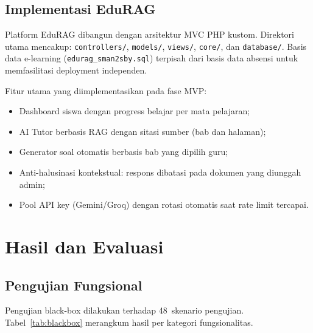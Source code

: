 \documentclass[12pt,a4paper]{article}
\newcommand{\edurag}{EduRAG}
\begin{document}
\subsection{Implementasi \edurag{}}

Platform \edurag{} dibangun dengan arsitektur MVC PHP kustom.
Direktori utama mencakup: \texttt{controllers/}, \texttt{models/},
\texttt{views/}, \texttt{core/}, dan \texttt{database/}.
Basis data e-learning (\texttt{edurag\_sman2sby.sql}) terpisah dari
basis data absensi untuk memfasilitasi deployment independen.

Fitur utama yang diimplementasikan pada fase MVP:
\begin{itemize}
  \item Dashboard siswa dengan progress belajar per mata pelajaran;
  \item AI Tutor berbasis RAG dengan sitasi sumber (bab dan halaman);
  \item Generator soal otomatis berbasis bab yang dipilih guru;
  \item Anti-halusinasi kontekstual: respons dibatasi pada dokumen
        yang diunggah admin;
  \item Pool API key (Gemini/Groq) dengan rotasi otomatis saat
        rate limit tercapai.
\end{itemize}

\section{Hasil dan Evaluasi}
\label{sec:eval}

\subsection{Pengujian Fungsional}

Pengujian black-box dilakukan terhadap 48~skenario pengujian.
Tabel~\ref{tab:blackbox} merangkum hasil per kategori fungsionalitas.
\end{document}
